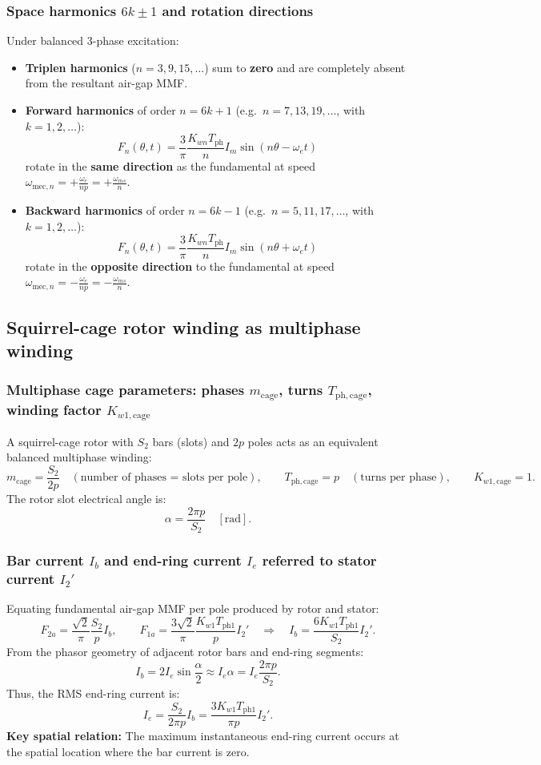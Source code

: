 \subsubsection{Space harmonics $6k \pm 1$ and rotation directions}
Under balanced 3-phase excitation:
\begin{itemize}
  \item \textbf{Triplen harmonics} (\(n = 3, 9, 15, \dots\)) sum to \textbf{zero} and are completely absent from the resultant air-gap MMF.
  \item \textbf{Forward harmonics} of order \(n = 6k + 1\) (e.g.\ \(n = 7, 13, 19, \dots\), with \(k = 1, 2, \dots\)):
  \[
  F_n(\theta, t) = \frac{3}{\pi}\frac{K_{wn} T_{\mathrm{ph}}}{n} I_m \sin(n\theta - \omega_e t)
  \]
  rotate in the \textbf{same direction} as the fundamental at speed \(\omega_{\mathrm{mec},n} = +\frac{\omega_e}{n p} = +\frac{\omega_{ms}}{n}\).
  \item \textbf{Backward harmonics} of order \(n = 6k - 1\) (e.g.\ \(n = 5, 11, 17, \dots\), with \(k = 1, 2, \dots\)):
  \[
  F_n(\theta, t) = \frac{3}{\pi}\frac{K_{wn} T_{\mathrm{ph}}}{n} I_m \sin(n\theta + \omega_e t)
  \]
  rotate in the \textbf{opposite direction} to the fundamental at speed \(\omega_{\mathrm{mec},n} = -\frac{\omega_e}{n p} = -\frac{\omega_{ms}}{n}\).
\end{itemize}

\subsection{Squirrel-cage rotor winding as multiphase winding}

\subsubsection{Multiphase cage parameters: phases $m_{\mathrm{cage}}$, turns $T_{\mathrm{ph,cage}}$, winding factor $K_{w1,\mathrm{cage}}$}
A squirrel-cage rotor with \(S_2\) bars (slots) and \(2p\) poles acts as an equivalent balanced multiphase winding:
\[
m_{\mathrm{cage}} = \frac{S_2}{2p}\quad(\text{number of phases = slots per pole}),
\qquad
T_{\mathrm{ph,cage}} = p\quad(\text{turns per phase}),
\qquad
K_{w1,\mathrm{cage}} = 1.
\]
The rotor slot electrical angle is:
\[
\alpha = \frac{2\pi p}{S_2}\quad[\text{rad}].
\]

\subsubsection{Bar current $I_b$ and end-ring current $I_e$ referred to stator current $I_2'$}
Equating fundamental air-gap MMF per pole produced by rotor and stator:
\[
F_{2a} = \frac{\sqrt{2}}{\pi}\frac{S_2}{p} I_b,
\qquad
F_{1a} = \frac{3\sqrt{2}}{\pi}\frac{K_{w1} T_{\mathrm{ph1}}}{p} I_2'
\quad\Rightarrow\quad
I_b = \frac{6 K_{w1} T_{\mathrm{ph1}}}{S_2} I_2'.
\]
From the phasor geometry of adjacent rotor bars and end-ring segments:
\[
I_b = 2 I_e \sin\frac{\alpha}{2} \approx I_e \alpha = I_e \frac{2\pi p}{S_2}.
\]
Thus, the RMS end-ring current is:
\[
I_e = \frac{S_2}{2\pi p} I_b = \frac{3 K_{w1} T_{\mathrm{ph1}}}{\pi p} I_2'.
\]
\textbf{Key spatial relation:} The maximum instantaneous end-ring current occurs at the spatial location where the bar current is zero.

